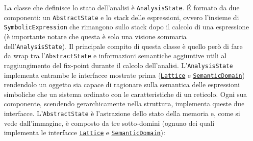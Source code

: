 La classe che definisce lo stato dell'analisi è \texttt{AnalysisState}. \'E formato da due componenti: un \texttt{AbstractState} e lo stack delle espressioni, ovvero l'insieme di \texttt{SymbolicExpression} che rimangono sullo stack dopo il calcolo di una espressione (è importante notare che questa è solo una visione sommaria dell'\texttt{AnalysisState}). Il principale compito di questa classe è quello però di fare da wrap tra l'\texttt{AbstractState} e informazioni semantiche aggiuntive utili al raggiungimento del fix-point durante il calcolo dell'analisi. L'\texttt{AnalysisState} implementa entrambe le interfacce mostrate prima (\hyperref[subsec:lattice]{\texttt{Lattice}} e \hyperref[subsec:semanticDomain]{\texttt{SemanticDomain}}) rendendolo un oggetto sia capace di ragionare sulla semantica delle espressioni simboliche che un sistema ordinato con le caratteristiche di un reticolo. Ogni sua componente, scendendo gerarchicamente nella struttura, implementa queste due interfacce. L'\texttt{AbstractState} è l'astrazione dello stato della memoria e, come si vede dall'immagine, è composto da tre sotto-domini (ognuno dei quali implementa le interfacce \hyperref[subsec:lattice]{\texttt{Lattice}} e \hyperref[subsec:semanticDomain]{\texttt{SemanticDomain}}): 

